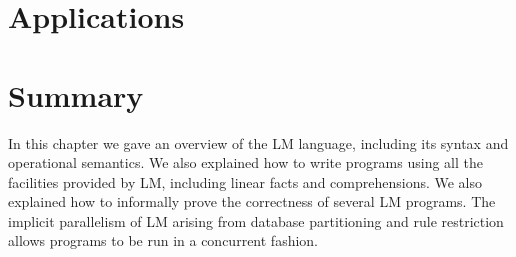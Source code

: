 \section{Applications}


\section{Summary}

In this chapter we gave an overview of the LM language, including its syntax and
operational semantics.  We also explained how to write programs using all the
facilities provided by LM, including linear facts and comprehensions. We also
explained how to informally prove the correctness of several LM programs.  The implicit
parallelism of LM arising from database partitioning and rule restriction allows
programs to be run in a concurrent fashion.

